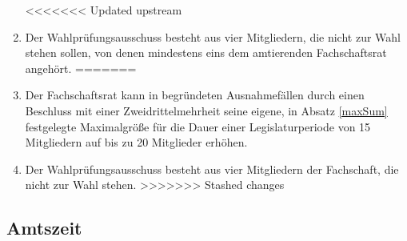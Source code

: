 \begin{enumerate}
<<<<<<< Updated upstream
\item Der Wahlprüfungsausschuss besteht aus vier Mitgliedern, die nicht zur Wahl stehen sollen, von denen mindestens eins dem amtierenden Fachschaftsrat angehört.
=======
\item Der Fachschaftsrat kann in begründeten Ausnahmefällen durch einen Beschluss mit einer Zweidrittelmehrheit seine eigene, in Absatz \ref{maxSum} festgelegte Maximalgröße für die Dauer einer Legislaturperiode von 15 Mitgliedern auf bis zu 20 Mitglieder erhöhen.
\item Der Wahlprüfungsausschuss besteht aus vier Mitgliedern der Fachschaft, die nicht zur Wahl stehen.
>>>>>>> Stashed changes
\end{enumerate}

\subsection{Amtszeit}

